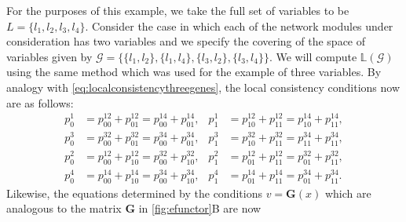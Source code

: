 For the purposes of this example, we take the full set of variables to be $L = \{ l_1,l_2,l_3,l_4 \}$. Consider the case in which each of the network modules under consideration has two variables and we specify the covering of the space of variables given by $\mathcal{G} = \{\{l_1,l_2 \},\{l_1,l_4 \},\{l_3,l_2\},\{l_3,l_4\} \}$.  We will compute $\mathbb{L}(\mathcal{G})$ using the same method which was used for the example of three variables.  By analogy with \autoref{eq:localconsistencythreegenes}, the local consistency conditions now are as follows:
\begin{equation}
\begin{aligned}\label{eq:pparsys}
p^1_0 &= p^{12}_{00} + p^{12}_{01} = p^{14}_{00} + p^{14}_{01}, &
p^1_1 &= p^{12}_{10} + p^{12}_{11} = p^{14}_{10} + p^{14}_{11},\\
p^3_0 &= p^{32}_{00} + p^{32}_{01} = p^{34}_{00} + p^{34}_{01},&
p^3_1 &= p^{32}_{10} + p^{32}_{11} = p^{34}_{11} + p^{34}_{11},\\
p^2_0 &= p^{12}_{00} + p^{12}_{10} = p^{32}_{00} + p^{32}_{10},&
p^2_1 &= p^{12}_{01} + p^{12}_{11} = p^{32}_{01} + p^{32}_{11},\\
p^4_0 &= p^{14}_{00} + p^{14}_{10} = p^{34}_{00} + p^{34}_{10},&
p^4_1 &= p^{14}_{01} + p^{14}_{11} = p^{34}_{01} + p^{34}_{11}.
\end{aligned}
\end{equation}
Likewise, the equations determined by the conditions $v = \mathbf{G}(x)$ which are analogous to the matrix $\mathbf{G}$ in \autoref{fig:efunctor}B are now
